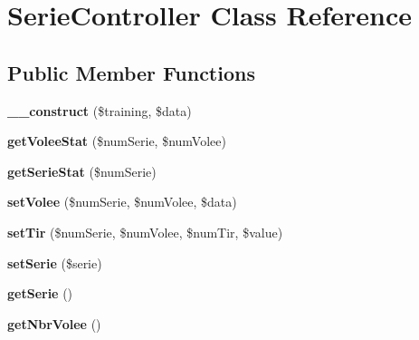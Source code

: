 \hypertarget{class_serie_controller}{}\section{Serie\+Controller Class Reference}
\label{class_serie_controller}
\subsection*{Public Member Functions}
\begin{DoxyCompactItemize}
\item 
\mbox{\label{class_serie_controller_ad62d7c541bf2804b0698bcf59410c536}} 
{\bfseries \+\_\+\+\_\+construct} (\$training, \$data)
\item 
\mbox{\label{class_serie_controller_a6d2b4d9eb80a06db6d61590393962079}} 
{\bfseries get\+Volee\+Stat} (\$num\+Serie, \$num\+Volee)
\item 
\mbox{\label{class_serie_controller_ad6c9ef3191ad14c56a996f463f6e3e8b}} 
{\bfseries get\+Serie\+Stat} (\$num\+Serie)
\item 
\mbox{\label{class_serie_controller_a5b4a6bb91d6e2a1c4b7584f7193bc5a6}} 
{\bfseries set\+Volee} (\$num\+Serie, \$num\+Volee, \$data)
\item 
\mbox{\label{class_serie_controller_ab2426c1a4321a7df5d1c8c8c1a3298b0}} 
{\bfseries set\+Tir} (\$num\+Serie, \$num\+Volee, \$num\+Tir, \$value)
\item 
\mbox{\label{class_serie_controller_a6341dbd661fc246aa8f1bf9766f11745}} 
{\bfseries set\+Serie} (\$serie)
\item 
\mbox{\label{class_serie_controller_a69781a1f5d727b1e5df0da9bb4a35504}} 
{\bfseries get\+Serie} ()
\item 
\mbox{\label{class_serie_controller_a9dd9781cd33277401c1e3256928eba9b}} 
{\bfseries get\+Nbr\+Volee} ()
\item 
\mbox{\label{class_serie_controller_a8ffc8c0d8f8e358ba1467e3cd78e5bdb}} 

\end{DoxyCompactItemize}
